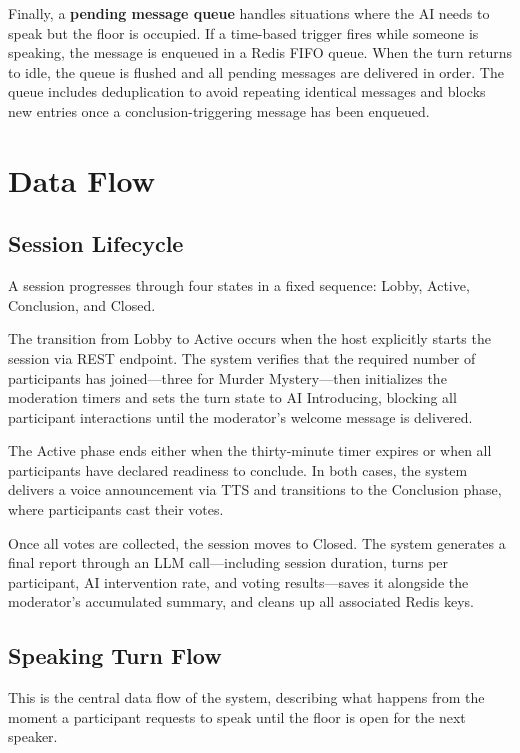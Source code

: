 Finally, a \textbf{pending message queue} handles situations where the AI needs to speak but the floor is occupied. If a time-based trigger fires while someone is speaking, the message is enqueued in a Redis FIFO queue. When the turn returns to idle, the queue is flushed and all pending messages are delivered in order. The queue includes deduplication to avoid repeating identical messages and blocks new entries once a conclusion-triggering message has been enqueued.


\section{Data Flow}

\subsection{Session Lifecycle}

A session progresses through four states in a fixed sequence: Lobby, Active, Conclusion, and Closed.

The transition from Lobby to Active occurs when the host explicitly starts the session via REST endpoint. The system verifies that the required number of participants has joined---three for Murder Mystery---then initializes the moderation timers and sets the turn state to AI Introducing, blocking all participant interactions until the moderator's welcome message is delivered.

The Active phase ends either when the thirty-minute timer expires or when all participants have declared readiness to conclude. In both cases, the system delivers a voice announcement via TTS and transitions to the Conclusion phase, where participants cast their votes.

Once all votes are collected, the session moves to Closed. The system generates a final report through an LLM call---including session duration, turns per participant, AI intervention rate, and voting results---saves it alongside the moderator's accumulated summary, and cleans up all associated Redis keys.


\subsection{Speaking Turn Flow}

This is the central data flow of the system, describing what happens from the moment a participant requests to speak until the floor is open for the next speaker.


